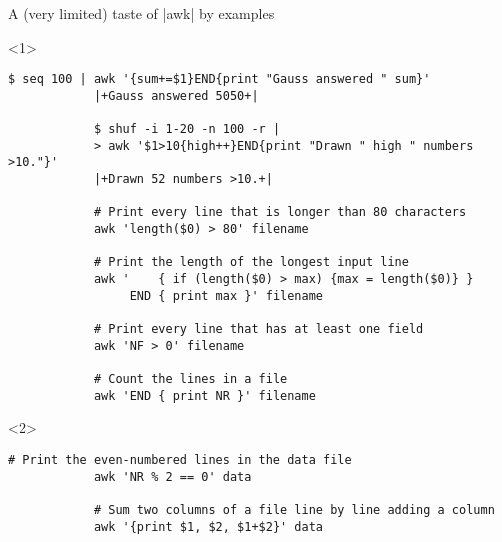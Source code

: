 \begin{frame}[fragile]{A (very limited) taste of \bash|awk| by examples}
    \vspace{-1mm}
    \begin{onlyenv}<1>
        \begin{lstlisting}[style=MyBash, numbers=none, xleftmargin=3mm, xrightmargin=3mm]
            $ seq 100 | awk '{sum+=$1}END{print "Gauss answered " sum}'
            |+Gauss answered 5050+|

            $ shuf -i 1-20 -n 100 -r |
            > awk '$1>10{high++}END{print "Drawn " high " numbers >10."}'
            |+Drawn 52 numbers >10.+|

            # Print every line that is longer than 80 characters
            awk 'length($0) > 80' filename

            # Print the length of the longest input line
            awk '    { if (length($0) > max) {max = length($0)} }
                 END { print max }' filename

            # Print every line that has at least one field
            awk 'NF > 0' filename

            # Count the lines in a file
            awk 'END { print NR }' filename
        \end{lstlisting}
    \end{onlyenv}
    \begin{onlyenv}<2>
        \begin{lstlisting}[style=MyBash, numbers=none, xleftmargin=3mm, xrightmargin=3mm, belowskip=-3mm]
            # Print the even-numbered lines in the data file
            awk 'NR % 2 == 0' data

            # Sum two columns of a file line by line adding a column
            awk '{print $1, $2, $1+$2}' data


\end{lstlisting}
\end{onlyenv}
\end{frame}
